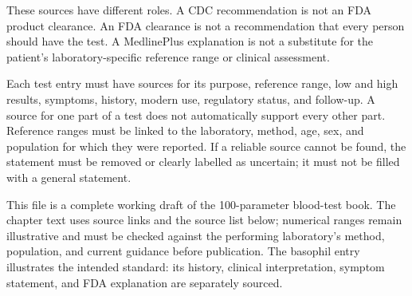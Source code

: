 \documentclass[11pt,openany]{book}
\begin{document}
These sources have different roles. A CDC recommendation is not an FDA
product clearance. An FDA clearance is not a recommendation that every person
should have the test. A MedlinePlus explanation is not a substitute for the
patient's laboratory-specific reference range or clinical assessment.

Each test entry must have sources for its purpose, reference range, low and
high results, symptoms, history, modern use, regulatory status, and follow-up.
A source for one part of a test does not automatically support every other
part. Reference ranges must be linked to the laboratory, method, age, sex, and
population for which they were reported. If a reliable source cannot be found,
the statement must be removed or clearly labelled as uncertain; it must not be
filled with a general statement.

This file is a complete working draft of the 100-parameter blood-test book.
The chapter text uses source links and the source list below; numerical ranges
remain illustrative and must be checked against the performing laboratory's
method, population, and current guidance before publication. The basophil
entry illustrates the intended standard: its history, clinical interpretation,
symptom statement, and FDA explanation are separately sourced.
\end{document}
